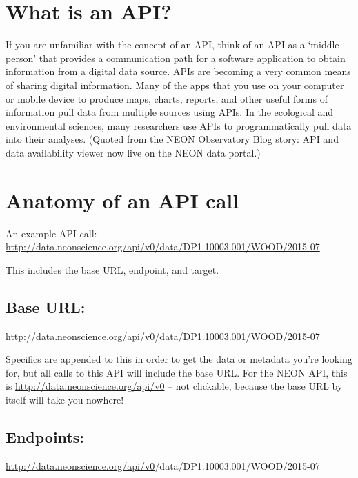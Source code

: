 \documentclass[]{book}
\begin{document}
\hypertarget{what-is-an-api}{%
\section{What is an API?}\label{what-is-an-api}}

If you are unfamiliar with the concept of an API, think of an API as a
`middle person' that provides a communication path for a software application
to obtain information from a digital data source. APIs are becoming a very
common means of sharing digital information. Many of the apps that you use on
your computer or mobile device to produce maps, charts, reports, and other
useful forms of information pull data from multiple sources using APIs. In
the ecological and environmental sciences, many researchers use APIs to
programmatically pull data into their analyses. (Quoted from the NEON Observatory
Blog story:
 API and data availability viewer now live on the NEON data portal.)

\hypertarget{anatomy-of-an-api-call}{%
\section{Anatomy of an API call}\label{anatomy-of-an-api-call}}

An example API call: \url{http://data.neonscience.org/api/v0/data/DP1.10003.001/WOOD/2015-07}

This includes the base URL, endpoint, and target.

\hypertarget{base-url}{%
\subsection{Base URL:}\label{base-url}}

{\url{http://data.neonscience.org/api/v0}}{/data/DP1.10003.001/WOOD/2015-07}

Specifics are appended to this in order to get the data or metadata you're
looking for, but all calls to this API will include the base URL. For the NEON
API, this is \url{http://data.neonscience.org/api/v0} --
not clickable, because the base URL by itself will take you nowhere!

\hypertarget{endpoints}{%
\subsection{Endpoints:}\label{endpoints}}

{\url{http://data.neonscience.org/api/v0}}{/data}{/DP1.10003.001/WOOD/2015-07}
\end{document}
